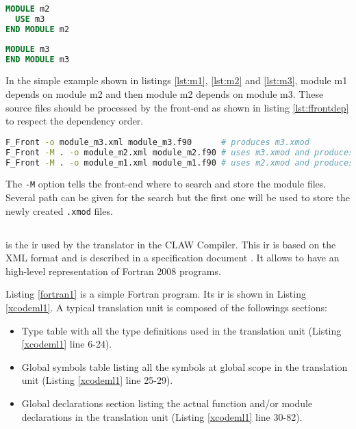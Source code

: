 \begin{lstlisting}[label=lst:m2, language=Fortran, caption=module\_m2.f90]
MODULE m2
  USE m3
END MODULE m2
\end{lstlisting}

\begin{lstlisting}[label=lst:m3, language=Fortran, caption=module\_m3.f90]
MODULE m3
END MODULE m3
\end{lstlisting}

In the simple example shown in listings \ref{lst:m1}, \ref{lst:m2} and
\ref{lst:m3}, module m1 depends on module m2 and then module m2
depends on module m3. These source files should be processed by the front-end
as shown in listing \ref{lst:ffrontdep} to respect the dependency order.

\begin{lstlisting}[label=lst:ffrontdep, language=Bash, caption=Parse module with dependencies]
F_Front -o module_m3.xml module_m3.f90      # produces m3.xmod
F_Front -M . -o module_m2.xml module_m2.f90 # uses m3.xmod and produces m2.xmod
F_Front -M . -o module_m1.xml module_m1.f90 # uses m2.xmod and produces m1.xmod
\end{lstlisting}

The \lstinline|-M| option tells the front-end where to search and store the
module files. Several path can be given for the search but the first one will
be used to store the newly created \lstinline|.xmod| files.


\subsection{\xcodemlf}
\xcodemlf is the \gls{ir} used by the
translator in the CLAW Compiler. This \gls{ir} is based on the XML
format and is described in a specification
document \cite{omni:xcodemlf95,omni:xcodemlf2008}. It allows to have an
high-level representation of Fortran 2008 programs.

Listing \ref{fortran1} is a simple Fortran program. Its \xcodemlf \gls{ir} is
shown in Listing \ref{xcodeml1}. A typical \xcodemlf translation unit is
composed of the followings sections:
\begin{itemize}
\item Type table with all the type definitions used in the translation unit
(Listing \ref{xcodeml1} line 6-24).
\item Global symbols table listing all the symbols at global scope in the
translation unit (Listing
\ref{xcodeml1} line 25-29).
\item Global declarations section listing the actual function and/or module
declarations in the translation unit (Listing \ref{xcodeml1} line 30-82).
\end{itemize}

